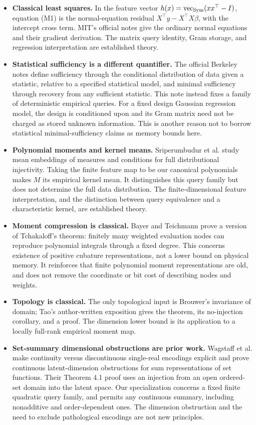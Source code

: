 \begin{itemize}
\item \textbf{Classical least squares.} In the feature vector
$h(x)=\operatorname{vec}_{\operatorname{Sym}}(xx^\top-I)$, equation (M1) is the
normal-equation residual $X^\top y-X^\top X\beta$, with the intercept
cross term. MIT's official notes give the ordinary normal equations
and their gradient derivation\cite{mit}. The matrix query identity,
Gram storage, and regression interpretation are established theory.
\item \textbf{Statistical sufficiency is a different quantifier.}
The official Berkeley notes define sufficiency through the
conditional distribution of data given a statistic, relative to a
specified statistical model, and minimal sufficiency through recovery
from any sufficient statistic\cite{berkeley}. This note instead
fixes a family of deterministic empirical queries. For a fixed design
Gaussian regression model, the design is conditioned upon and its
Gram matrix need not be charged as stored unknown information. This
is another reason not to borrow statistical minimal-sufficiency
claims as memory bounds here.
\item \textbf{Polynomial moments and kernel means.}
Sriperumbudur et al. study mean embeddings of measures and conditions
for full distributional injectivity\cite{kme}. Taking the finite
feature map to be our canonical polynomials makes $M$ its empirical
kernel mean. It distinguishes this query family but does not
determine the full data distribution. The finite-dimensional feature
interpretation, and the distinction between query equivalence and
a characteristic kernel, are established theory.
\item \textbf{Moment compression is classical.}
Bayer and Teichmann prove a version of Tchakaloff's theorem: finitely
many weighted evaluation nodes can reproduce polynomial integrals
through a fixed degree\cite{tchakaloff}. This concerns existence of
positive cubature representations, not a lower bound on physical
memory. It reinforces that finite polynomial moment representations
are old, and does not remove the coordinate or bit cost of describing
nodes and weights.
\item \textbf{Topology is classical.}
The only topological input is Brouwer's invariance of domain;
Tao's author-written exposition gives the theorem, its no-injection
corollary, and a proof\cite{tao}. The dimension lower bound is its
application to a locally full-rank empirical moment map.
\item \textbf{Set-summary dimensional obstructions are prior work.}
Wagstaff et al. make continuity versus discontinuous single-real
encodings explicit and prove continuous latent-dimension obstructions
for sum representations of set functions\cite{wagstaff}. Their
Theorem 4.1 proof uses an injection from an open ordered-set domain
into the latent space. Our specialization concerns a fixed finite
quadratic query family, and permits any continuous summary, including
nonadditive and order-dependent ones. The dimension obstruction and
the need to exclude pathological encodings are not new principles.
\end{itemize}

